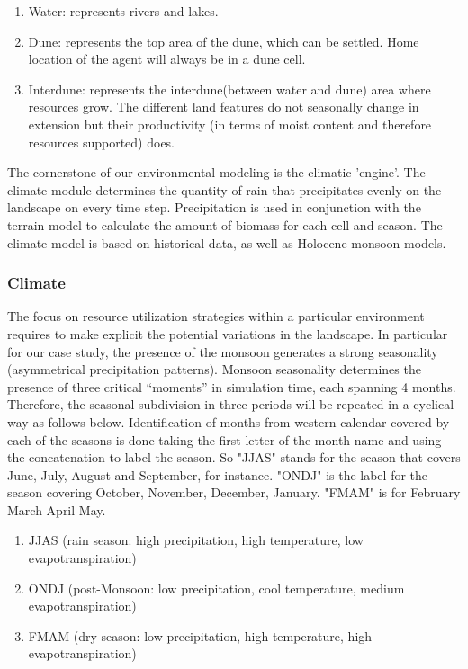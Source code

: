 \documentclass[11pt,oneside,a4paper,openright]{report}
\begin{document}
\begin{enumerate}
\item Water: represents rivers and lakes.
\item Dune: represents the top area of the dune, which can be settled. Home location of the
agent will always be in a dune cell.
\item Interdune: represents the interdune(between water and dune) area where resources grow. The different land
features do not seasonally change in extension but their productivity (in terms of moist content
and therefore resources supported) does.
\end{enumerate}

The cornerstone of our environmental modeling is the climatic 'engine'. The climate module
determines the quantity of rain that precipitates evenly on the landscape on every time step.
Precipitation is used in conjunction with the terrain model to calculate the amount of biomass for each
cell and season. The climate model is based on historical data, as well as Holocene monsoon models.


\subsubsection{Climate}

The focus on resource utilization strategies within a particular environment requires to make explicit
the potential variations in the landscape. In particular for our case study, the presence of the monsoon
generates a strong seasonality (asymmetrical precipitation patterns).
Monsoon seasonality determines the presence of three critical “moments” in simulation time, each
spanning 4 months. Therefore, the seasonal subdivision in three periods will be repeated in a cyclical
way as follows below. Identification of months from western calendar covered by each of the seasons is done 
taking the first letter of the month name and using the concatenation to label the season. So "JJAS" stands 
for the season that covers June, July, August and September, for instance. "ONDJ" is the label for the 
season covering October, November, December, January. "FMAM" is for February March April May.    


\begin{enumerate}
\item JJAS (rain season: high precipitation, high temperature, low evapotranspiration)
\item ONDJ (post-Monsoon: low precipitation, cool temperature, medium evapotranspiration)
\item FMAM (dry season: low precipitation, high temperature, high evapotranspiration)
\end{enumerate}
\end{document}
